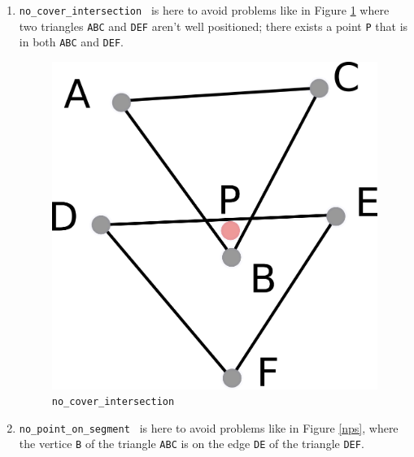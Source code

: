 \documentclass[a4paper,10pt]{article}
\def\ttt#1#2{{\tt{\color{black}#1} #2}}
\begin{document}
\begin{enumerate}
\item \ttt{no\_cover\_intersection}{} is here to avoid problems like in Figure \ref{nci} where two triangles {\tt ABC} and {\tt DEF} aren't well positioned; there exists a point {\tt P} that is in both {\tt ABC} and {\tt DEF}.
\\
\begin{figure}
\centering
\includegraphics[scale=2]{nci}
\caption{\label{nci} {\tt no\_cover\_intersection}}
\end{figure}
\item \ttt{no\_point\_on\_segment}{} is here to avoid problems like in Figure \ref{nps}, where the vertice {\tt B} of the triangle {\tt ABC} is on the edge {\tt DE} of the triangle {\tt DEF}.
\\
\begin{figure}
\centering

\end{figure}
\end{enumerate}
\end{document}

